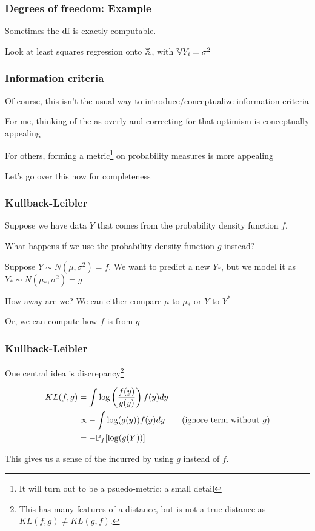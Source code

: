 \documentclass{beamer}
\begin{document}
\begin{frame}
\frametitle{Degrees of freedom: Example}
Sometimes the $\df$ is exactly computable.  


\vsp
Look at least squares regression onto $\X$, with $\V Y_i = \sigma^2$

\vvvsp
\vvvsp

\vfill
\end{frame}
\begin{frame}
\frametitle{Information criteria}
Of course, this isn't the usual way to introduce/conceptualize information criteria

\vsp
For me, thinking of the  as overly  and correcting
for that optimism is conceptually appealing

\vsp
For others, forming a metric\footnote{It will turn out to be a psuedo-metric; a small detail} on
probability measures is more appealing

\vsp
Let's go over this now for completeness
\end{frame}


\begin{frame}
\frametitle{ Kullback-Leibler}

Suppose we have data $Y$ that comes from the probability density function $f$.

\vsp
What happens if we use the probability density function $g$ instead?

\vsp
{} Suppose $Y \sim N(\mu,\sigma^2) = f$.  We want to predict a new $Y_*$, but
we model it as $Y_* \sim N(\mu_*,\sigma^2) = g$

\vsp
How  away are we?  We can either compare $\mu$ to $\mu_*$ or $Y$ to $Y^*$


\vsp
Or, we can compute how  $f$ is from $g$

\end{frame}

\begin{frame}
\frametitle{ Kullback-Leibler}


One central idea is  discrepancy\footnote{This has many features of a distance, but is not a true distance as $KL(f,g) \neq KL(g,f)$.} 

\begin{align*}
KL(f,g) & = \int \log\left( \frac{f(y)}{g(y)} \right)f(y) dy \\
& \propto
-\int \log (g(y)) f(y) dy \qquad \textrm{(ignore term without $g$)}\\
& = 
-\P_f [\log (g(Y))] 
\end{align*}

This gives us a sense of the  incurred by using $g$ instead of $f$. 
\end{frame}
\end{document}
